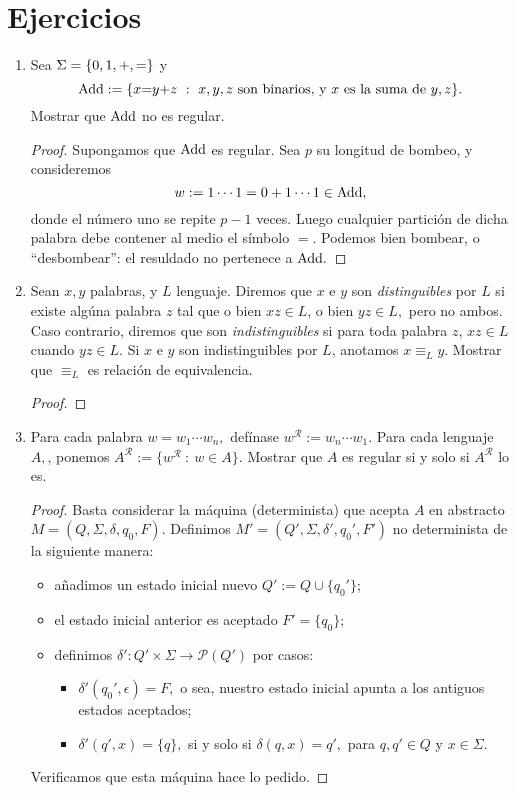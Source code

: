 \section{Ejercicios}

\begin{enumerate}
    \item Sea \(\Sigma=\{0,1,{\tt +},{\tt =}\}\) y \[{\rm Add} := \{x{\tt =}y{\tt +}z \ : \ x,y,z \text{ son binarios, y } x \text{ es la suma de } y,z\}.\]
    Mostrar que \({\rm Add}\) no es regular.

    \begin{proof}
        Supongamos que \({\rm Add}\) es regular. Sea \(p\) su longitud de bombeo, y consideremos \[w:=1\cdots 1=0+1\cdots 1\in {\rm Add},\] donde el n\'umero uno se repite \(p-1\) veces.
        Luego cualquier partici\'on de dicha palabra debe contener al medio el s\'imbolo \(=\). Podemos bien bombear, o ``desbombear'': el resuldado no pertenece a \({\rm Add}.\) 
    \end{proof}
    \item Sean \(x,y\) palabras, y \(L\) lenguaje. Diremos que \(x\) e \(y\) son \emph{distinguibles} por \(L\) si existe alg\'una palabra \(z\) tal que o bien \(xz\in L\), o bien \(yz \in L,\) pero no ambos. Caso contrario, diremos que son \emph{indistinguibles} si para toda palabra \(z\), \(xz\in L\) cuando \(yz\in L.\)
    Si \(x\) e \(y\) son indistinguibles por \(L\), anotamos \(x\equiv_Ly.\) Mostrar que \(\equiv_L\) es relaci\'on de equivalencia.

    \begin{proof}
    \end{proof}
    \item Para cada palabra \(w=w_1\cdots w_n,\) def\'inase \(w^{\mathcal{R}}:=w_n\cdots w_1.\) Para cada lenguaje \(A,\), ponemos \(A^\mathcal{R}:=\{w^\mathcal{R}\ :\ w\in A\}.\) Mostrar que \(A\) es regular si y solo si \(A^\mathcal{R}\) lo es.
    \begin{proof}
        Basta considerar la m\'aquina (determinista) que acepta \(A\) en abstracto \(M=(Q,\Sigma,\delta,q_0,F).\)
        Definimos \(M'=(Q',\Sigma,\delta',q_0',F')\) no determinista de la siguiente manera:
        \begin{itemize}
            \item a\~nadimos un estado inicial nuevo \(Q':=Q\cup\{q_0'\}\);
            \item el estado inicial anterior es aceptado \(F'=\{q_0\}\);
            \item definimos \(\delta':Q' \times \Sigma \to \mathcal{P}(Q')\) por casos:
            \begin{itemize}
                \item \(\delta'(q_0',\epsilon)=F,\) o sea, nuestro estado inicial apunta a los antiguos estados aceptados;
                \item \(\delta'(q',x)=\{q\},\) si y solo si \(\delta(q,x)=q',\) para \(q,q'\in Q\) y \(x\in\Sigma.\)
            \end{itemize}
        \end{itemize}
        Verificamos que esta m\'aquina hace lo pedido.
    \end{proof}
\end{enumerate}